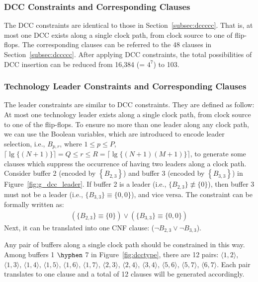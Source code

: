 \subsubsection{DCC Constraints and Corresponding Clauses}
\label{sec:TVA:dcc_c}
The DCC constraints are identical to those in Section~\ref{subsec:dccccc}. That is, at most one DCC exists along a single clock path, from clock source to one of flip-flops. The corresponding clauses can be referred to the 48 clauses in Section~\ref{subsec:dccccc}. After applying DCC constraints, the total possibilities of DCC insertion can be reduced from 16,384 (= $4^7$) to 103. 

\subsubsection{Technology Leader Constraints and Corresponding Clauses}
\label{sec:TVA:dcc_c}
The leader constraints are similar to DCC constraints. They are defined as follow: At most one technology leader exists along a single clock path, from clock source to one of the flip-flops. To ensure no more than one leader along any clock path, we can use the Boolean variables, which are introduced to encode leader selection, i.e., $B_{p,r}$, where $1 \leq p \leq P$, $\lceil \lg \{(N + 1)\} \rceil = Q \leq r \leq R = \lceil \lg \{(N + 1)(M + 1)\} \rceil$, to generate some clauses which suppress the occurrence of having two leaders along a clock path. Consider buffer 2 (encoded by {\fontsize{8}{8.4}$\left\{B_{2,3}\right\}$}) and buffer 3 (encoded by {\fontsize{8}{8.4}$\left\{B_{3,3}\right\}$}) in Figure~\ref{fig:g_dcc_leader}. If buffer 2 is a leader (i.e., {\fontsize{8}{8.4}$\{B_{2,3}\} \not\equiv \{0\}$}), then buffer 3 must not be a leader (i.e., {\fontsize{8}{8.4}$\{B_{3,3}\} \equiv \{0, 0\}$}), and vice versa. The constraint can be formally written as:
{
\fontsize{8}{8.4}
\begin{gather*}
\left(\{B_{2,3}\} \equiv \{0\}\right) \lor \left(\{B_{3,3}\} \equiv \{0, 0\}\right)
\end{gather*}
}
Next, it can be translated into one CNF clause:
{\fontsize{8}{8.4}($\neg B_{2,3}\lor\neg B_{3,3}$).} 

Any pair of buffers along a single clock path should be constrained in this way. Among buffers 1 $\hyphen$ 7 in Figure~\ref{fig:dcctype}, there are 12 pairs: $\langle1, 2\rangle$, $\langle1, 3\rangle$, $\langle1, 4\rangle$, $\langle1, 5\rangle$, $\langle1, 6\rangle$, $\langle1, 7\rangle$, $\langle2, 3\rangle$, $\langle2, 4\rangle$, $\langle3, 4\rangle$, $\langle5, 6\rangle$, $\langle5, 7\rangle$, $\langle6, 7\rangle$. Each pair translates to one clause and a total of 12 clauses will be generated accordingly.

